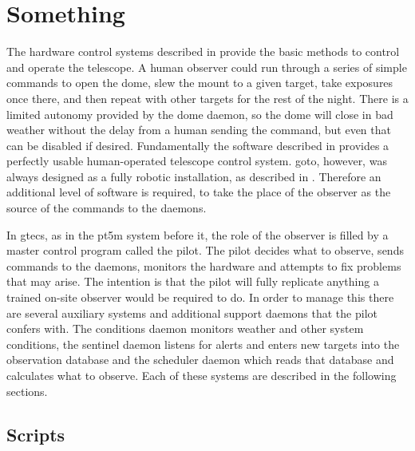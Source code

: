 \section{Something}
\label{sec:something}
\begin{colsection}


\begin{colsection}


The hardware control systems described in  provide the basic methods to control and operate the telescope. A human observer could run through a series of simple commands to open the dome, slew the mount to a given target, take exposures once there, and then repeat with other targets for the rest of the night. There is a limited autonomy provided by the dome daemon, so the dome will close in bad weather without the delay from a human sending the command, but even that can be disabled if desired. Fundamentally the software described in  provides a perfectly usable human-operated telescope control system. \gls{goto}, however, was always designed as a fully robotic installation, as described in . Therefore an additional level of software is required, to take the place of the observer as the source of the commands to the daemons.

In \gls{gtecs}, as in the \gls{pt5m} system before it, the role of the observer is filled by a master control program called the pilot. The pilot decides what to observe, sends commands to the daemons, monitors the hardware and attempts to fix problems that may arise. The intention is that the pilot will fully replicate anything a trained on-site observer would be required to do. In order to manage this there are several auxiliary systems and additional support daemons that the pilot confers with. The conditions daemon monitors weather and other system conditions, the sentinel daemon listens for alerts and enters new targets into the observation database and the scheduler daemon which reads that database and calculates what to observe. Each of these systems are described in the following sections.

\end{colsection}


\subsection{Scripts}
\label{sec:scripts}
\begin{colsection}


\end{colsection}
\end{colsection}
